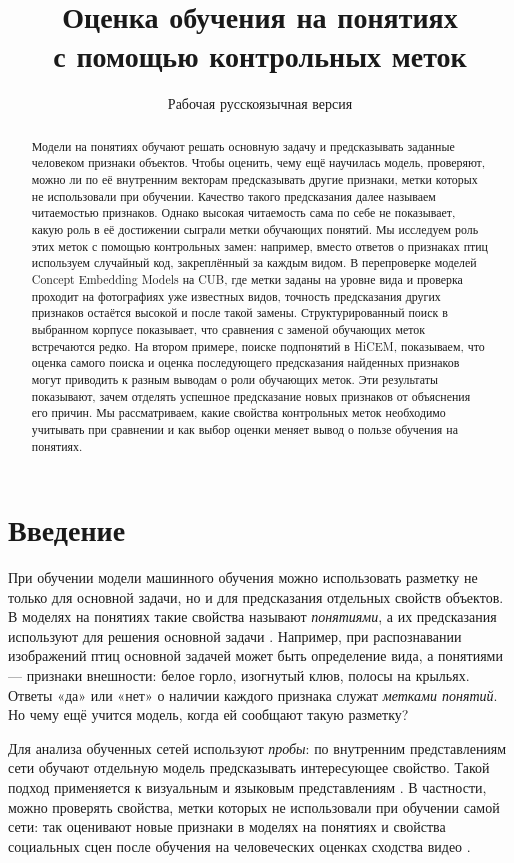 \documentclass[10pt]{article}
\title{Оценка обучения на понятиях\\с помощью контрольных меток}
\author{Рабочая русскоязычная версия}
\begin{document}
\maketitle
\begin{abstract}
Модели на понятиях обучают решать основную задачу и предсказывать заданные человеком признаки объектов. Чтобы оценить, чему ещё научилась модель, проверяют, можно ли по её внутренним векторам предсказывать другие признаки, метки которых не использовали при обучении. Качество такого предсказания далее называем читаемостью признаков. Однако высокая читаемость сама по себе не показывает, какую роль в её достижении сыграли метки обучающих понятий. Мы исследуем роль этих меток с помощью контрольных замен: например, вместо ответов о признаках птиц используем случайный код, закреплённый за каждым видом. В перепроверке моделей Concept Embedding Models на CUB, где метки заданы на уровне вида и проверка проходит на фотографиях уже известных видов, точность предсказания других признаков остаётся высокой и после такой замены. Структурированный поиск в выбранном корпусе показывает, что сравнения с заменой обучающих меток встречаются редко. На втором примере, поиске подпонятий в HiCEM, показываем, что оценка самого поиска и оценка последующего предсказания найденных признаков могут приводить к разным выводам о роли обучающих меток. Эти результаты показывают, зачем отделять успешное предсказание новых признаков от объяснения его причин. Мы рассматриваем, какие свойства контрольных меток необходимо учитывать при сравнении и как выбор оценки меняет вывод о пользе обучения на понятиях.
\end{abstract}

\section{Введение}
При обучении модели машинного обучения можно использовать разметку не только для основной задачи, но и для предсказания отдельных свойств объектов. В моделях на понятиях такие свойства называют \emph{понятиями}, а их предсказания используют для решения основной задачи \citep{cbm,cem}. Например, при распознавании изображений птиц основной задачей может быть определение вида, а понятиями --- признаки внешности: белое горло, изогнутый клюв, полосы на крыльях. Ответы «да» или «нет» о наличии каждого признака служат \emph{метками понятий}. Но чему ещё учится модель, когда ей сообщают такую разметку?

Для анализа обученных сетей используют \emph{пробы}: по внутренним представлениям сети обучают отдельную модель предсказывать интересующее свойство. Такой подход применяется к визуальным и языковым представлениям \citep{alain,conneau}. В частности, можно проверять свойства, метки которых не использовали при обучении самой сети: так оценивают новые признаки в моделях на понятиях \citep{cem} и свойства социальных сцен после обучения на человеческих оценках сходства видео \citep{garcia}.
\end{document}
